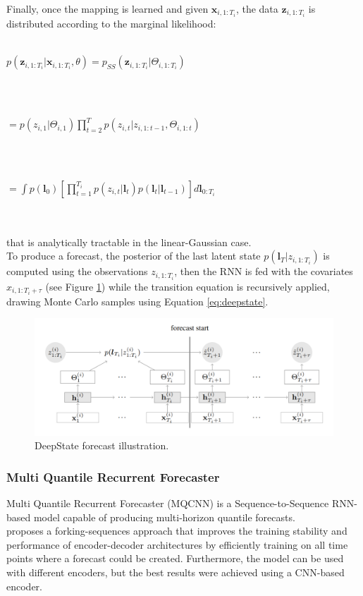 \documentclass[a4paper, 12pt]{article} %
\begin{document}
	Finally, once the mapping is learned and given $\pmb{x}_{i, 1:T_i}$, the data $\pmb{z}_{i,1:T_i}$ is distributed according to the marginal likelihood:\\\\
	\centerline{
	$
	p(\pmb{z}_{i, 1:T_i} | \pmb{x}_{i, 1:T_i}, \theta)
	= p_{SS}(\pmb{z}_{i, 1:T_i} | \Theta_{i,1:T_i})
	$
	}\\\\
	\centerline{
		$
		= p(z_{i,1} | \Theta_{i,1}) \prod_{t=2}^{T}p(z_{i,t} | z_{i, 1:t-1}, \Theta_{i, 1:t})
		$
	}\\\\
	\centerline{
		$
		= \int p(\pmb{l}_0) [\prod_{t=1}^{T_i} p(z_{i,t} | \pmb{l}_t)p(\pmb{l}_t | \pmb{l}_{t-1})] d\pmb{l}_{0:T_i}
		$
	}\\\\
	that is analytically tractable in the linear-Gaussian case.\\
	To produce a forecast, the posterior of the last latent state $p(\pmb{l}_T | z_{i, 1:T_i})$ is computed using the observations $z_{i, 1:T_i}$, then the RNN is fed with the covariates $x_{i, 1:T_i+\tau}$ (see Figure \ref{fig:deepstate2}) while the transition equation is recursively applied, drawing Monte Carlo samples using Equation \ref{eq:deepstate}.
	\begin{figure}
		\includegraphics[width=\linewidth]{img/deepstate2.png}
		\caption{DeepState forecast illustration.}
		\label{fig:deepstate2}
	\end{figure}

	\subsubsection{Multi Quantile Recurrent Forecaster } \label{sssec:mqcnn}
	Multi Quantile Recurrent Forecaster (MQCNN) \cite{MQCNN} is a Sequence-to-Sequence RNN-based model capable of producing multi-horizon quantile forecasts.\\
	\cite{MQCNN} proposes a forking-sequences approach that improves the training stability and performance of encoder-decoder architectures by efficiently training on all time points where a forecast could be created. Furthermore, the model can be used with different encoders, but the best results were achieved using a CNN-based encoder.
	
\end{document}
